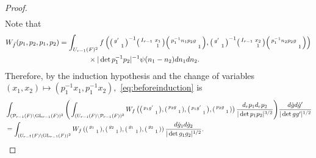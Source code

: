 \documentclass[12pt]{amsart}
\theoremstyle{remark}
\numberwithin{equation}{section}
\newcommand{\GL}{\mathrm{GL}}
\theoremstyle{definition}
\newenvironment{psmatrix}
  {\left(\begin{smallmatrix}}
  {\end{smallmatrix}\right)}
\numberwithin{equation}{subsection}
\begin{document}
\begin{proof}
\begin{align*}
\end{align*}
Note that 
\begin{align*}
    W_{\tilde{f}}(p_1,p_2,p_1,p_2)&=\int_{U_{r-1}(F)^2}f\left(\begin{psmatrix} g' & \\ & 1 \end{psmatrix}^{-1}\begin{psmatrix}I_{r-1} & x_1\\ & 1 \end{psmatrix} \begin{psmatrix} p_1^{-1}n_1p_2g & \\ & 1 \end{psmatrix} ,\begin{psmatrix} g' & \\ & 1 \end{psmatrix}^{-1}\begin{psmatrix}I_{r-1} & x_2\\ & 1 \end{psmatrix} \begin{psmatrix} p_1^{-1}n_2p_2g & \\ & 1 \end{psmatrix}\right)\\
    &\quad \quad \quad \quad \times |\det p_1^{-1}p_2|^{-1}\psi(n_1-n_2)dn_1dn_2.
\end{align*}
Therefore, by the induction hypothesis and the change of variables $(x_1,x_2)\mapsto (p_1^{-1}x_1, p_1^{-1}x_2),$ \eqref{eq:beforeinduction} is
\begin{align*}
&\int_{(\mathcal{P}_{r-1}(F) \backslash \GL_{r-1}(F))^2} \Bigg(\int_{(U_{r-1}(F) \backslash \mathcal{P}_{r-1}(F))^2}W_{f}\left(\begin{psmatrix} p_1g' & \\ & 1 \end{psmatrix}, \begin{psmatrix} p_2g & \\ & 1 \end{psmatrix},\begin{psmatrix} p_1g' & \\ & 1 \end{psmatrix}, \begin{psmatrix} p_2g & \\ & 1 \end{psmatrix}\right)\frac{d_rp_1 d_rp_2}{|\det p_1p_2|^{3/2}} \Bigg) \frac{d\dot{g} d\dot{g}'}{|\det gg'|^{1/2}}
\\&=\int_{(U_{r-1}(F) \backslash \GL_{r-1}(F))^2}W_{f}\left(\begin{psmatrix} g_1 & \\ & 1 \end{psmatrix},\begin{psmatrix} g_2 & \\ & 1 \end{psmatrix},\begin{psmatrix} g_1 & \\ & 1 \end{psmatrix},\begin{psmatrix} g_2 & \\ & 1 \end{psmatrix}\right) \frac{d\dot{g}_1d\dot{g}_2}{|\det g_1g_2|^{1/2}}.

\end{align*}
\end{proof}
\end{document}
